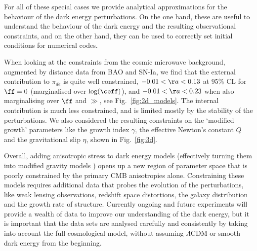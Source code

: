 For all of these special cases we provide analytical approximations for the behaviour of the dark energy perturbations.
On the one hand, these are useful to understand the behaviour of the dark energy and the resulting observational constraints, and on the other hand, they can be used to correctly set initial conditions for numerical codes. 

When looking at the constraints from the cosmic microwave background, augmented by distance data from BAO and SN-Ia,
we find that the external contribution to $\pi_{de}$ is quite well constrained, $-0.01 < \aa < 0.13$ at 95\% CL for $\ff=0$ (marginalised 
over $\log(\ceff)$), and $-0.01 < \aa < 0.23$ when also marginalising over $\ff$ and $\gg$,
see Fig.\ \ref{fig:2d_models}. The internal contribution 
is much less constrained, and is limited mostly by the stability of the perturbations. We also considered the resulting
constraints on the `modified growth' parameters like the growth index $\gamma$, the effective Newton's constant $Q$
and the gravitational slip $\eta$, shown in Fig.\ \ref{fig:3d}. 

Overall, adding anisotropic stress to dark energy models (effectively turning them into modified gravity models \cite{Saltas:2010tt})
opens up a new region of parameter space that is poorly constrained by the primary CMB anisotropies alone. Constraining these
models requires additional data that probes the evolution of the perturbations, like weak lensing observations, redshift space
distortions, the galaxy distribution and the growth rate of structure. Currently ongoing and future experiments will provide a wealth
of data to improve our understanding of the dark energy, but it is important that the data sets are analysed carefully and consistently
by taking into account the full cosmological model, without assuming $\Lambda$CDM or smooth dark energy from the beginning.
